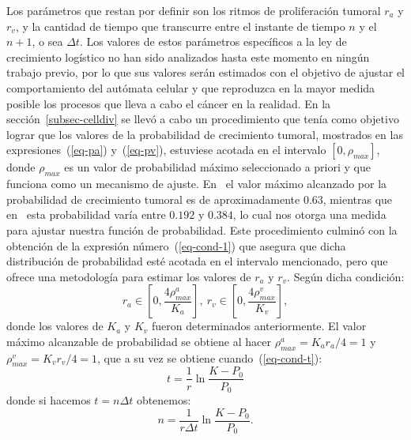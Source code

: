 Los par\'ametros que restan por definir son los ritmos de proliferaci\'on tumoral $r_a$ y $r_v$, y la cantidad de tiempo que transcurre entre el instante de tiempo $n$ y el $n+1$, o sea $\Delta t$. Los valores de estos par\'ametros espec\'ificos a la ley de crecimiento log\'istico no han sido analizados hasta este momento en ning\'un trabajo previo, por lo que sus valores ser\'an estimados con el objetivo de ajustar el comportamiento del aut\'omata celular y que reproduzca en la mayor medida posible los procesos que lleva a cabo el c\'ancer en la realidad. En la secci\'on~\ref{subsec-celldiv} se llev\'o a cabo un procedimiento que ten\'ia como objetivo lograr que los valores de la probabilidad de crecimiento tumoral, mostrados en las expresiones~(\ref{eq-pa}) y~(\ref{eq-pv}), estuviese acotada en el intervalo $[0,\rho_{max}]$, donde $\rho_{max}$ es un valor de probabilidad m\'aximo seleccionado a priori y que funciona como un mecanismo de ajuste. En~\cite{ruben} el valor m\'aximo alcanzado por la probabilidad de crecimiento tumoral es de aproximadamente $0$.$63$, mientras que en~\cite{kansal,kansal3} esta probabilidad var\'ia entre $0$.$192$ y $0$.$384$, lo cual nos otorga una medida para ajustar nuestra funci\'on de probabilidad. Este procedimiento culmin\'o con la obtenci\'on de la expresi\'on n\'umero~(\ref{eq-cond-1}) que asegura que dicha distribuci\'on de probabilidad est\'e acotada en el intervalo mencionado, pero que ofrece una metodolog\'ia para estimar los valores de $r_a$ y $r_v$. Seg\'un dicha condici\'on:
\begin{subequations}
\begin{equation*}
r_a \in \left[0, \frac{4 \rho_{max}^a}{K_a}\right],~r_v \in \left[0, \frac{4 \rho_{max}^v}{K_v}\right],
\end{equation*}
\end{subequations}
donde los valores de $K_a$ y $K_v$ fueron determinados anteriormente. El valor m\'aximo alcanzable de probabilidad se obtiene al hacer $\rho_{max}^a= K_a r_a / 4 = 1$ y $\rho_{max}^v= K_v r_v / 4 = 1$, que a su vez se obtiene cuando~(\ref{eq-cond-t}):
\begin{equation}
t = \frac{1}{r} \ln\frac{K-P_0}{P_0}
\end{equation}
donde si hacemos $t=n\Delta t$ obtenemos:
\begin{equation}
n = \frac{1}{r\Delta t} \ln\frac{K-P_0}{P_0}. \label{final}
\end{equation}

